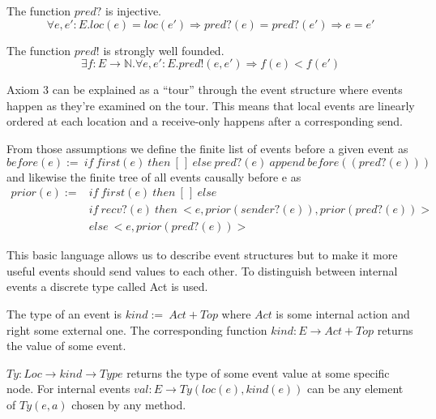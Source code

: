 \begin{axiom}
  The function $pred?$ is injective.
  \[\forall e,e':E.loc(e) = loc(e')\Rightarrow pred?(e) = pred?(e')\Rightarrow e=e'\]
\end{axiom}

\begin{axiom}
  The function $pred!$ is strongly well founded.
  \[\exists f:E\rightarrow \mathbb{N}.\forall e,e':E.pred!(e,e')\Rightarrow f(e)<f(e')\]
\end{axiom}

Axiom 3 can be explained as a ``tour'' through the event structure where
events happen as they're examined on the tour. This means that local
events are linearly ordered at each location and a receive-only happens
after a corresponding send.~\cite{bickford2005causal}

From those assumptions we define the finite list of events before a given event as
\[before(e):=\ if\ first(e)\ then\ [\,]\ else\ pred?(e)\ append\ before((pred?(e)))\] 
and likewise the finite tree of all events causally before e as
\begin{align*}
  prior(e):= & if\ first(e)\ then\ [\,]\ else\\
             & if\ recv?(e)\ then\ <e,prior(sender?(e)),prior(pred?(e))>\\
             & else\ <e,prior(pred?(e))>
\end{align*}

This basic language allows us to describe event structures but to make
it more useful events should send values to each other. To distinguish
between internal events a discrete type called Act is used.~\cite{bickford2005causal}

\begin{defi}
  The type of an event is $kind :=\ Act + Top$ where $Act$ is some
  internal action and right some external one. The corresponding function
  $kind: E\rightarrow Act + Top$ returns the value of some event.
\end{defi}

\begin{defi}
  $Ty:Loc\rightarrow kind\rightarrow Type$ returns the type of some event value at some specific
  node. For internal events $val:E\rightarrow Ty(loc(e),kind(e))$ can be any element of
  $Ty(e,a)$ chosen by any method.
\end{defi}

